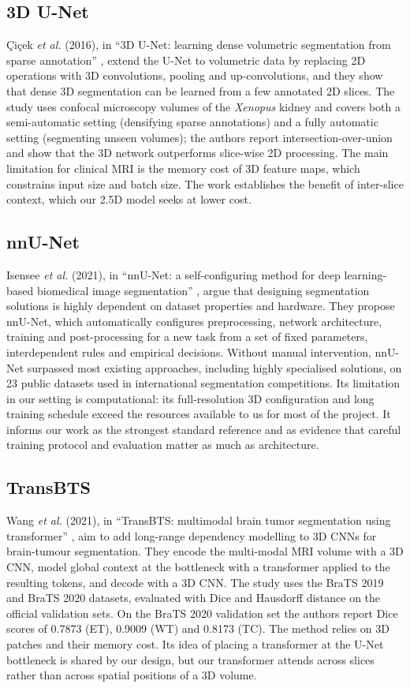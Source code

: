 \subsection{3D U-Net}
\c{C}i\c{c}ek \emph{et al.} (2016), in ``3D U-Net: learning dense volumetric segmentation from sparse annotation'' \cite{cicek2016}, extend the U-Net to volumetric data by replacing 2D operations with 3D convolutions, pooling and up-convolutions, and they show that dense 3D segmentation can be learned from a few annotated 2D slices. The study uses confocal microscopy volumes of the \emph{Xenopus} kidney and covers both a semi-automatic setting (densifying sparse annotations) and a fully automatic setting (segmenting unseen volumes); the authors report intersection-over-union and show that the 3D network outperforms slice-wise 2D processing. The main limitation for clinical MRI is the memory cost of 3D feature maps, which constrains input size and batch size. The work establishes the benefit of inter-slice context, which our 2.5D model seeks at lower cost.

\subsection{nnU-Net}
Isensee \emph{et al.} (2021), in ``nnU-Net: a self-configuring method for deep learning-based biomedical image segmentation'' \cite{isensee2021}, argue that designing segmentation solutions is highly dependent on dataset properties and hardware. They propose nnU-Net, which automatically configures preprocessing, network architecture, training and post-processing for a new task from a set of fixed parameters, interdependent rules and empirical decisions. Without manual intervention, nnU-Net surpassed most existing approaches, including highly specialised solutions, on 23 public datasets used in international segmentation competitions. Its limitation in our setting is computational: its full-resolution 3D configuration and long training schedule exceed the resources available to us for most of the project. It informs our work as the strongest standard reference and as evidence that careful training protocol and evaluation matter as much as architecture.

\subsection{TransBTS}
Wang \emph{et al.} (2021), in ``TransBTS: multimodal brain tumor segmentation using transformer'' \cite{wang2021transbts}, aim to add long-range dependency modelling to 3D CNNs for brain-tumour segmentation. They encode the multi-modal MRI volume with a 3D CNN, model global context at the bottleneck with a transformer applied to the resulting tokens, and decode with a 3D CNN. The study uses the BraTS 2019 and BraTS 2020 datasets, evaluated with Dice and Hausdorff distance on the official validation sets. On the BraTS 2020 validation set the authors report Dice scores of 0.7873 (ET), 0.9009 (WT) and 0.8173 (TC). The method relies on 3D patches and their memory cost. Its idea of placing a transformer at the U-Net bottleneck is shared by our design, but our transformer attends across slices rather than across spatial positions of a 3D volume.


